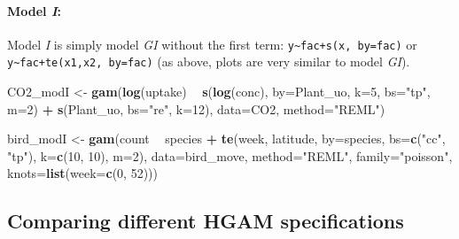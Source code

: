 \documentclass[12pt]{article}
\newenvironment{Shaded}{\begin{snugshade}}{\end{snugshade}}
\newcommand{\KeywordTok}[1]{\textcolor[rgb]{0.13,0.29,0.53}{\textbf{#1}}}
\newcommand{\DataTypeTok}[1]{\textcolor[rgb]{0.13,0.29,0.53}{#1}}
\newcommand{\DecValTok}[1]{\textcolor[rgb]{0.00,0.00,0.81}{#1}}
\newcommand{\StringTok}[1]{\textcolor[rgb]{0.31,0.60,0.02}{#1}}
\newcommand{\OperatorTok}[1]{\textcolor[rgb]{0.81,0.36,0.00}{\textbf{#1}}}
\newcommand{\NormalTok}[1]{#1}
\let\oldparagraph\paragraph
\renewcommand{\paragraph}[1]{\oldparagraph{#1}\mbox{}}
\begin{document}
\paragraph{\texorpdfstring{Model \emph{I}:}{Model I:}}\label{model-i}

Model \emph{I} is simply model \emph{GI} without the first term:
\texttt{y\textasciitilde{}fac+s(x,\ by=fac)} or
\texttt{y\textasciitilde{}fac+te(x1,x2,\ by=fac)} (as above, plots are
very similar to model \emph{GI}).

\begin{Shaded}
\begin{Highlighting}[]
\NormalTok{CO2_modI <-}\StringTok{ }\KeywordTok{gam}\NormalTok{(}\KeywordTok{log}\NormalTok{(uptake) }\OperatorTok{~}\StringTok{ }\KeywordTok{s}\NormalTok{(}\KeywordTok{log}\NormalTok{(conc), }\DataTypeTok{by=}\NormalTok{Plant_uo, }\DataTypeTok{k=}\DecValTok{5}\NormalTok{, }\DataTypeTok{bs=}\StringTok{"tp"}\NormalTok{, }\DataTypeTok{m=}\DecValTok{2}\NormalTok{) }\OperatorTok{+}
\StringTok{                  }\KeywordTok{s}\NormalTok{(Plant_uo, }\DataTypeTok{bs=}\StringTok{"re"}\NormalTok{, }\DataTypeTok{k=}\DecValTok{12}\NormalTok{),}
                \DataTypeTok{data=}\NormalTok{CO2, }\DataTypeTok{method=}\StringTok{"REML"}\NormalTok{)}


\NormalTok{bird_modI <-}\StringTok{ }\KeywordTok{gam}\NormalTok{(count }\OperatorTok{~}\StringTok{ }\NormalTok{species }\OperatorTok{+}\StringTok{ }\KeywordTok{te}\NormalTok{(week, latitude, }\DataTypeTok{by=}\NormalTok{species,}
                                      \DataTypeTok{bs=}\KeywordTok{c}\NormalTok{(}\StringTok{"cc"}\NormalTok{, }\StringTok{"tp"}\NormalTok{), }\DataTypeTok{k=}\KeywordTok{c}\NormalTok{(}\DecValTok{10}\NormalTok{, }\DecValTok{10}\NormalTok{), }\DataTypeTok{m=}\DecValTok{2}\NormalTok{),}
                 \DataTypeTok{data=}\NormalTok{bird_move, }\DataTypeTok{method=}\StringTok{"REML"}\NormalTok{, }\DataTypeTok{family=}\StringTok{"poisson"}\NormalTok{,}
                 \DataTypeTok{knots=}\KeywordTok{list}\NormalTok{(}\DataTypeTok{week=}\KeywordTok{c}\NormalTok{(}\DecValTok{0}\NormalTok{, }\DecValTok{52}\NormalTok{)))}
\end{Highlighting}
\end{Shaded}

\subsection{Comparing different HGAM
specifications}\label{comparing-different-hgam-specifications}
\end{document}
